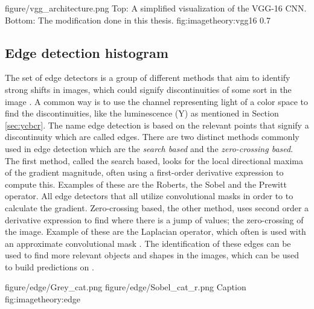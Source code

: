 \singlefigurenear
{figure/vgg_architecture.png}
{Top: A simplified visualization of the VGG-16 CNN. Bottom: The modification done in this thesis.}
{fig:imagetheory:vgg16}
{0.7}

\subsection{Edge detection histogram}
\label{sec:sob_feature}
The set of edge detectors is a group of different methods that aim to identify strong shifts in images, which could signify discontinuities of some sort in the image \cite{canny1986computational}. A common way is to use the channel representing light of a color space to find the discontinuities, like the luminescence (Y) as mentioned in Section \ref{sec:ycbcr}. The name edge detection is based on the relevant points that signify a discontinuity which are called edges. There are two distinct methods commonly used in edge detection which are the \emph{search based} and the \emph{zero-crossing based}. The first method, called the search based, looks for the local directional maxima of the gradient magnitude, often using a first-order derivative expression to compute this. Examples of these are the Roberts, the Sobel  and the Prewitt operator. All edge detectors that all utilize convolutional masks in order to to calculate the gradient. Zero-crossing based, the other method, uses second order a derivative expression to find where there is a jump of values; the zero-crossing of the image. Example of these are the Laplacian operator, which often is used with an approximate convolutional mask \cite{jain1995machine}. The identification of these edges can be used to find more relevant objects and shapes in the images, which can be used to build predictions on \cite{maini2009study}. 

\twofigure
{figure/edge/Grey_cat.png}
{figure/edge/Sobel_cat_r.png}
{Caption}
{fig:imagetheory:edge} 
